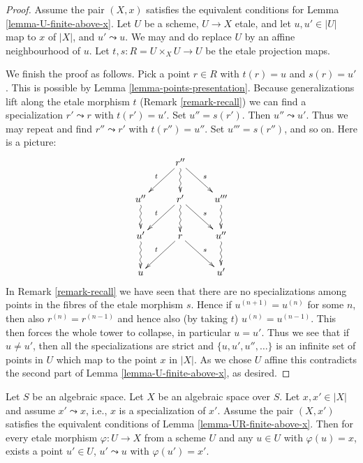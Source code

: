 \begin{proof}
Assume the pair $(X, x)$ satisfies the
equivalent conditions for Lemma \ref{lemma-U-finite-above-x}.
Let $U$ be a scheme, $U \to X$ etale, and
let $u, u' \in |U|$ map to $x$ of $|X|$, and
$u' \leadsto u$. We may and do replace $U$ by an affine
neighbourhood of $u$. Let $t, s : R = U \times_X U \to U$
be the etale projection maps.

\medskip\noindent
We finish the proof as follows.
Pick a point $r \in R$ with $t(r) = u$ and $s(r) = u'$.
This is possible by
Lemma \ref{lemma-points-presentation}.
Because generalizations lift along the etale morphism $t$
(Remark \ref{remark-recall}) we can find a specialization $r' \leadsto r$ with
$t(r') = u'$. Set $u'' = s(r')$. Then $u'' \leadsto u'$.
Thus we may repeat and find $r'' \leadsto r'$ with
$t(r'') = u''$. Set $u''' = s(r'')$, and so on.
Here is a picture:
$$
\xymatrix{
& r'' \ar[rd]^s \ar[ld]_t \ar@{~>}[d] & \\
u'' \ar@{~>}[d] & r' \ar[rd]^s \ar[ld]_t \ar@{~>}[d] & u''' \ar@{~>}[d] \\
u' \ar@{~>}[d] & r \ar[rd]^s \ar[ld]_t & u'' \ar@{~>}[d] \\
u & & u'
}
$$
In Remark \ref{remark-recall} we have seen that there are no specializations
among points in the fibres of the etale morphism $s$. Hence if
$u^{(n + 1)} = u^{(n)}$ for some $n$, then also $r^{(n)} = r^{(n - 1)}$ and
hence also (by taking $t$) $u^{(n)} = u^{(n - 1)}$. This then forces the
whole tower to collapse, in particular $u = u'$. Thus we see that if
$u \not = u'$, then all the specializations are strict and
$\{u, u', u'', \ldots\}$ is an infinite set of points in $U$ which map to the
point $x$ in $|X|$. As we chose $U$ affine this contradicts the second part of
Lemma \ref{lemma-U-finite-above-x}, as desired.
\end{proof}

\begin{lemma}
\label{lemma-specialization}
Let $S$ be an algebraic space.
Let $X$ be an algebraic space over $S$.
Let $x, x' \in |X|$ and assume $x' \leadsto x$, i.e., $x$ is a
specialization of $x'$.
Assume the pair $(X, x')$ satisfies the equivalent conditions
of Lemma \ref{lemma-UR-finite-above-x}. Then
for every etale morphism $\varphi : U \to X$ from a scheme $U$ and any
$u \in U$ with $\varphi(u) = x$, exists a point $u'\in U$,
$u' \leadsto u$ with $\varphi(u') = x'$.
\end{lemma}

